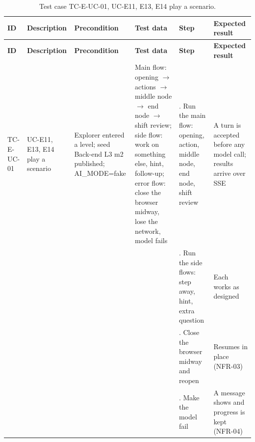 {\footnotesize{}\renewcommand{\arraystretch}{1.1}
\begin{longtable}{|>{\raggedright\arraybackslash}p{}|>{\raggedright\arraybackslash}p{}|>{\raggedright\arraybackslash}p{}|>{\raggedright\arraybackslash}p{}|>{\raggedright\arraybackslash}p{}|>{\raggedright\arraybackslash}p{}|}
\caption{Test case TC-E-UC-01, UC-E11, E13, E14 play a scenario.} \\
\hline
\textbf{ID} & \textbf{Description} & \textbf{Precondition} & \textbf{Test data} & \textbf{Step} & \textbf{Expected result} \\ \hline
\endfirsthead
\hline
\textbf{ID} & \textbf{Description} & \textbf{Precondition} & \textbf{Test data} & \textbf{Step} & \textbf{Expected result} \\ \hline
\endhead
TC-E-UC-01 & UC-E11, E13, E14 play a scenario & Explorer entered a level; seed Back-end L3 m2 published; AI\_\allowbreak{}MODE=fake & Main flow: opening $\rightarrow$ actions $\rightarrow$ middle node $\rightarrow$ end node $\rightarrow$ shift review; side flow: work on something else, hint, follow-up; error flow: close the browser midway, lose the network, model fails & 1. Run the main flow: opening, action, middle node, end node, shift review & A turn is accepted before any model call; results arrive over SSE \\ \cline{5-6}
 &  &  &  & 2. Run the side flows: step away, hint, extra question & Each works as designed \\ \cline{5-6}
 &  &  &  & 3. Close the browser midway and reopen & Resumes in place (NFR-03) \\ \cline{5-6}
 &  &  &  & 4. Make the model fail & A message shows and progress is kept (NFR-04) \\ \hline
\end{longtable}
}

